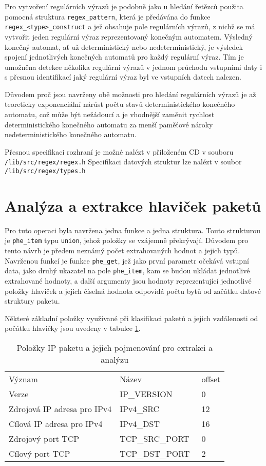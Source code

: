 Pro vytvoření regulárních výrazů je podobně jako u hledání řetězců
použita pomocná struktura \texttt{regex\_pattern}, která je předávána do funkce \texttt{regex\_<type>\_construct}
a jež obsahuje pole regulárních výrazů, z nichž se má vytvořit jeden regulární výraz reprezentovaný konečným automatem.
Výsledný konečný automat, ať už deterministický nebo nedeterministický, je výsledek spojení jednotlivých
konečných automatů pro každý regulární výraz. Tím je umožněna detekce několika
regulární výrazů v jednom průchodu vstupními daty i s přesnou identifikací jaký regulární
výraz byl ve vstupních datech nalezen.

Důvodem proč jsou navrženy obě možnosti pro hledání regulárních výrazů je až teoreticky exponenciální nárůst
počtu stavů deterministického konečného automatu, což může být nežádoucí a je vhodnější
zaměnit rychlost deterministického konečného automatu za menší paměťové nároky nedeterministického konečného automatu.

Přesnou specifikaci rozhraní je možné nalézt v přiloženém CD v souboru \texttt{/lib/src/regex/regex.h}
Specifikaci datových struktur lze nalézt v soubor \texttt{/lib/src/regex/types.h}

\section{Analýza a extrakce hlaviček paketů}\label{api:phe} %

Pro tuto operaci byla navržena jedna funkce a jedna struktura.
Touto strukturou je \texttt{phe\_item} typu \texttt{union}, jehož položky
se vzájemně překrývají. Důvodem pro tento návrh je předem neznámý počet extrahovaných hodnot a jejich typů.
Navrženou funkcí je funkce \texttt{phe\_get}, jež jako první parametr očekává
vstupní data, jako druhý ukazatel na pole \texttt{phe\_item},
kam se budou ukládat jednotlivé extrahované hodnoty, a další argumenty jsou hodnoty reprezentující jednotlivé
položky hlaviček a jejich číselná hodnota odpovídá počtu bytů
od začátku datové struktury paketu.

Některé základní položky využívané při klasifikaci paketů a jejich vzdálenosti od počátku hlavičky
jsou uvedeny v tabulce \ref{tab:phe}.

\begin{table}[!htbp]
	\center
    \begin{tabular}{|l|l|l|}
    \hline
    Význam & Název & offset \\ \hhline{|=|=|=|}
    Verze & IP\_VERSION & 0 \\ \hline
    Zdrojová IP adresa pro IPv4 & IPv4\_SRC & 12 \\ \hline
    Cílová IP adresa pro IPv4 & IPv4\_DST & 16 \\ \hline
    Zdrojový port TCP & TCP\_SRC\_PORT\ & 0 \\ \hline
    Cílový port TCP & TCP\_DST\_PORT & 2 \\ \hline
    \end{tabular}
	\caption{Položky IP paketu a jejich pojmenování pro extrakci a analýzu}
    \label{tab:phe}
\end{table}

